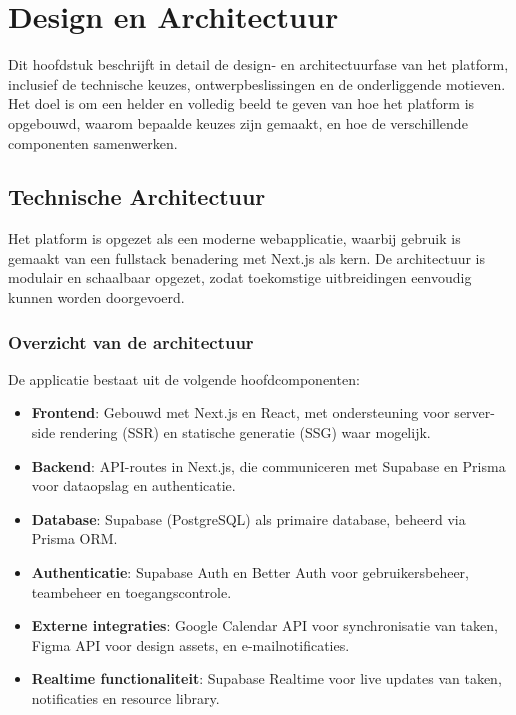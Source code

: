 \chapter{Design en Architectuur}
\label{ch:design}

Dit hoofdstuk beschrijft in detail de design- en architectuurfase van het platform, inclusief de technische keuzes, ontwerpbeslissingen en de onderliggende motieven. Het doel is om een helder en volledig beeld te geven van hoe het platform is opgebouwd, waarom bepaalde keuzes zijn gemaakt, en hoe de verschillende componenten samenwerken.

\section{Technische Architectuur}
\label{sec:tech-architectuur}

Het platform is opgezet als een moderne webapplicatie, waarbij gebruik is gemaakt van een fullstack benadering met Next.js als kern. De architectuur is modulair en schaalbaar opgezet, zodat toekomstige uitbreidingen eenvoudig kunnen worden doorgevoerd.

\subsection{Overzicht van de architectuur}
De applicatie bestaat uit de volgende hoofdcomponenten:
\begin{itemize}
    \item \textbf{Frontend}: Gebouwd met Next.js en React, met ondersteuning voor server-side rendering (SSR) en statische generatie (SSG) waar mogelijk.
    \item \textbf{Backend}: API-routes in Next.js, die communiceren met Supabase en Prisma voor dataopslag en authenticatie.
    \item \textbf{Database}: Supabase (PostgreSQL) als primaire database, beheerd via Prisma ORM.
    \item \textbf{Authenticatie}: Supabase Auth en Better Auth voor gebruikersbeheer, teambeheer en toegangscontrole.
    \item \textbf{Externe integraties}: Google Calendar API voor synchronisatie van taken, Figma API voor design assets, en e-mailnotificaties.
    \item \textbf{Realtime functionaliteit}: Supabase Realtime voor live updates van taken, notificaties en resource library.
\end{itemize}

